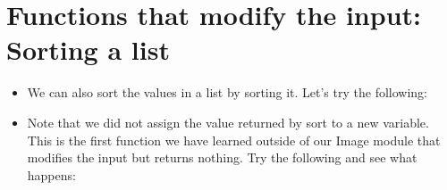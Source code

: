 \documentclass[letterpaper,10pt,english]{sphinxmanual}
\begin{document}
\section{Functions that modify the input: Sorting a list}
\label{\detokenize{lecture_notes/lec08_lists1:functions-that-modify-the-input-sorting-a-list}}\begin{itemize}
\item {} 
We can also sort the values in a list by sorting it. Let’s try the
following:

%
\begin{sphinxVerbatim}[commandchars=\\\{\}]
  \PYG{p}{[}      \PYGZbs{}
\PYG{g+go}{\PYGZsq{}Saturn\PYGZsq{}, \PYGZsq{}Neptune\PYGZsq{}, \PYGZsq{}Uranus\PYGZsq{}, \PYGZsq{}Pluto\PYGZsq{} ]}
\end{sphinxVerbatim}

\item {} 
Note that we did not assign the value returned by sort to a new
variable. This is the first function we have learned outside
of our Image module that modifies the
input but returns nothing. Try the following and see what happens:


\end{itemize}
\end{document}
